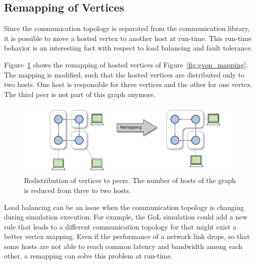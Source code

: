 \subsection{Remapping of Vertices}
\label{sec:remapping}
Since the communication topology is separated from the communication
library, it is possible to move a hosted vertex to another host at
run-time.  This run-time behavior is an interesting fact with respect
to load balancing and fault tolerance.


Figure~\ref{fig:gvon_remapping} shows the remapping of
hosted vertices of Figure~\ref{fig:gvon_mapping}. The mapping is modified, such that the
hosted vertices are distributed only to two hosts. One host is responsible for three
vertices and the other for one vertex. The third peer is not part of this
graph anymore.

\begin{figure}[H]
  \centering
  \includegraphics[width=\textwidth]{graphics/30_gvon_remapping}
  \caption{Redistribution of vertices to peers. The number of hosts of
    the graph is reduced from three to two hosts.}
  \label{fig:gvon_remapping}
\end{figure}

\noindent Load balancing can be an issue when the communication
topology is changing during simulation execution. For example, the GoL
simulation could add a new rule that leads to a different
communication topology for that might exist a better vertex mapping.
Even if the performance of a network link drops, so that some hosts
are not able to reach common latency and bandwidth among each other, a
remapping can solve this problem at run-time.


